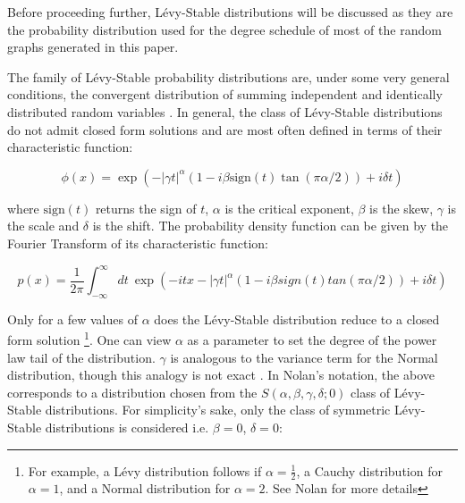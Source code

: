 \documentclass[twoside,11pt]{article}
\begin{document}

Before proceeding further, L\'evy-Stable distributions will be discussed
as they are the probability distribution used for the degree schedule
of most of the random graphs generated in this paper.

The family of L\'evy-Stable probability distributions are, under some very general
conditions, the convergent distribution of summing independent and identically
distributed random variables \cite{nolan,feller}.
In general, the class of L\'evy-Stable distributions do not admit closed
form solutions and are most often defined in terms of
their characteristic function:

$$ \phi(x) = \exp ( -|\gamma t|^\alpha ( 1 - i \beta \text{sign}(t) \tan(\pi \alpha / 2)) + i \delta t) $$

where $\text{sign}(t)$ returns the sign of $t$, $\alpha$ is the critical exponent,
$\beta$ is the skew, $\gamma$ is the scale and $\delta$ is the shift.
The probability density function
can be given by the Fourier Transform of its characteristic function:

$$ p(x) = \frac{1}{2\pi} \int_{-\infty}^{\infty} dt \ \exp( - i t x - |\gamma t |^\alpha 
( 1 - i \beta sign(t) tan(\pi \alpha /2)) + i \delta t ) $$

Only for a few
values of $\alpha$ does the L\'evy-Stable distribution reduce to a closed form solution
\footnote{For example, a L\'evy distribution follows
  if $\alpha = \frac{1}{2}$, a Cauchy distribution for $ \alpha = 1 $, and a Normal distribution for $ \alpha = 2$.  See Nolan \citeyear{nolan}
for more details}.
One can view $\alpha$ as a parameter to set the degree of the power law tail of the distribution.
$\gamma$ is analogous to the variance term for the Normal distribution, though this analogy is not exact \cite{nolan}.
In Nolan's \citeyear{nolan} notation,
the above corresponds
to a distribution chosen from the $S(\alpha, \beta, \gamma, \delta; 0)$ class of L\'evy-Stable distributions.
For simplicity's sake, only the class of symmetric L\'evy-Stable distributions is considered i.e. $\beta=0$, $\delta=0$:
\end{document}
